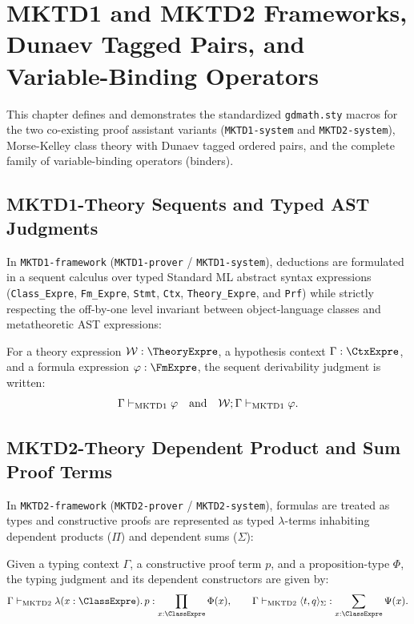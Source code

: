 \section{MKTD1 and MKTD2 Frameworks, Dunaev Tagged Pairs, and Variable-Binding Operators}

This chapter defines and demonstrates the standardized \texttt{gdmath.sty} macros for the two co-existing proof assistant variants (\texttt{MKTD1-system} and \texttt{MKTD2-system}), Morse-Kelley class theory with Dunaev tagged ordered pairs, and the complete family of variable-binding operators (binders).

\subsection{MKTD1-Theory Sequents and Typed AST Judgments}

In \texttt{MKTD1-framework} (\texttt{MKTD1-prover} / \texttt{MKTD1-system}), deductions are formulated in a sequent calculus over typed Standard ML abstract syntax expressions (\texttt{Class\_Expre}, \texttt{Fm\_Expre}, \texttt{Stmt}, \texttt{Ctx}, \texttt{Theory\_Expre}, and \texttt{Prf}) while strictly respecting the off-by-one level invariant between object-language classes and metatheoretic AST expressions:
\begin{definition}
For a theory expression $\mathcal{W} : \TheoryExpre$, a hypothesis context $\Gamma : \CtxExpre$, and a formula expression $\varphi : \FmExpre$, the sequent derivability judgment is written:
\[
  \Gamma \vdash_{\mathrm{MKTD1}} \varphi
  \quad\text{and}\quad
  \mathcal{W} ; \Gamma \vdash_{\mathrm{MKTD1}} \varphi.
\]
\end{definition}

\subsection{MKTD2-Theory Dependent Product and Sum Proof Terms}

In \texttt{MKTD2-framework} (\texttt{MKTD2-prover} / \texttt{MKTD2-system}), formulas are treated as types and constructive proofs are represented as typed $\lambda$-terms inhabiting dependent products ($\Pi$) and dependent sums ($\Sigma$):
\begin{definition}
Given a typing context $\Gamma$, a constructive proof term $p$, and a proposition-type $\Phi$, the typing judgment and its dependent constructors are given by:
\[
  \mktdty{\Gamma}{\LamTerm{x}{\ClassExpre}{p}}{\DepProd{x}{\ClassExpre}{\Phi(x)}},
  \qquad
  \mktdty{\Gamma}{\DepPair{t}{q}}{\DepSum{x}{\ClassExpre}{\Psi(x)}}.
\]
\end{definition}

